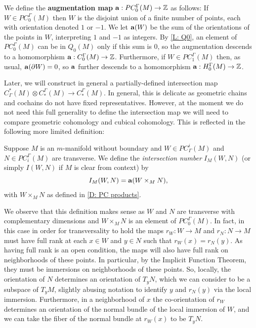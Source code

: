 \begin{definition}\label{D: aug}
We define the \textbf{augmentation map} $\mathbf{a}:PC^\Gamma_0(M)\to \mathbb{Z}$ as follows: If $W\in PC^\Gamma_0(M)$ then $W$ is the disjoint union of a finite number of points, each with orientation denoted $1$ or $-1$. We let $\mathbf{a}(W)$ be the sum of the orientations of the points in $W$, interpreting $1$ and $-1$ as integers.  By \cref{L: Q0}, an element of $PC^\Gamma_0(M)$ can be in $Q_0(M)$ only if this sum is $0$, so the augmentation descends to a homomorphism $\mathbf{a}:C^\Gamma_0(M)\to \mathbb{Z}$. Furthermore, if $W\in PC_1^\Gamma(M)$ then, as usual, $\mathbf{a}(\partial W)=0$, so $\mathbf{a}$ further descends to a homomorphism $\mathbf{a}:H_0^\Gamma(M)\to \mathbb{Z}$.
\end{definition}

Later, we will construct in general a partially-defined intersection map $C^*_\Gamma(M)\otimes C_*^\Gamma(M)\to C_*^\Gamma(M)$. In general, this is delicate as geometric chains and cochains do not have fixed representatives. However, at the moment we do not need this full generality to define the intersection map we will need to compare geometric cohomology and cubical cohomology. This is reflected in the following more limited definition:


\begin{definition}\label{D: intersection number}
Suppose $M$ is an $m$-manifold without boundary and $W\in PC_\Gamma^i(M)$ and $N\in PC_{i}^\Gamma(M)$ are transverse. We define the \textit{intersection number} $I_M(W,N)$ (or simply $I(W,N)$ if $M$ is clear from context) by $$I_M(W,N)=\mathbf{a}(W \times_M N),$$ with $W\times_MN$ as defined in \cref{D: PC products}.
\end{definition}



We observe that this definition makes sense as $W$ and $N$ are transverse with complementary dimensions and $W\times_MN$ is an element of $PC_0^\Gamma(M)$. In fact, in this case in order for transversality to hold the maps $r_W:W\to M$ and $r_N:N\to M$ must have full rank at each $x\in W$ and $y\in N$ such that $r_W(x)=r_N(y)$. As having full rank is an open condition, the maps will also have full rank on neighborhoods of these points. In particular, by the Implicit Function Theorem, they must be immersions on neighborhoods of these points. So, locally, the orientation of $N$ determines an orientation of $T_yN$, which we can consider to be a subspace of $T_{y}M$, slightly abusing notation to identify $y$ and $r_N(y)$ via the local immersion. Furthermore, in a neighborhood of $x$ the co-orientation of $r_W$ determines an orientation of the normal bundle of the local immersion of $W$, and we can take the fiber of the normal bundle at $r_W(x)$ to be $T_yN$.

